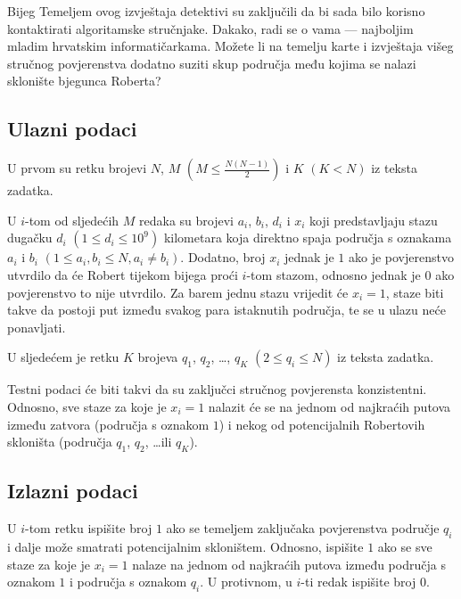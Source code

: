 \begin{statement}[
  problempoints=100,
  timelimit=1 sekunda,
  memorylimit=512 MiB,
]{Bijeg}
Temeljem ovog izvještaja detektivi su zaključili da bi sada bilo korisno
kontaktirati algoritamske stručnjake. Dakako, radi se o vama --- najboljim
mladim hrvatskim informatičarkama. Možete li na temelju karte i izvještaja višeg
stručnog povjerenstva dodatno suziti skup područja među kojima se nalazi
sklonište bjegunca Roberta?

\subsection*{Ulazni podaci}

U prvom su retku brojevi $N$, $M$ $(M \le \frac{N(N-1)}{2})$ i $K$ $(K < N)$
iz teksta zadatka.

U $i$-tom od sljedećih $M$ redaka su brojevi $a_i$, $b_i$, $d_i$ i $x_i$ koji
predstavljaju stazu dugačku $d_i$ $(1 \le d_i \le 10^9)$ kilometara koja
direktno spaja područja s oznakama $a_i$ i $b_i$ $(1 \le a_i, b_i \le N, a_i
\ne b_i)$. Dodatno, broj $x_i$ jednak je $1$ ako je povjerenstvo utvrdilo da će
Robert tijekom bijega proći $i$-tom stazom, odnosno jednak je $0$ ako
povjerenstvo to nije utvrdilo. Za barem jednu stazu vrijedit će $x_i = 1$,
staze biti takve da postoji put između svakog para istaknutih područja, te se u
ulazu neće ponavljati.

U sljedećem je retku $K$ brojeva $q_1$, $q_2$, \ldots, $q_K$ $(2 \le q_i \le N)$
iz teksta zadatka.

Testni podaci će biti takvi da su zaključci stručnog povjerensta konzistentni.
Odnosno, sve staze za koje je $x_i = 1$ nalazit će se na jednom od najkraćih
putova između zatvora (područja s oznakom $1$) i nekog od potencijalnih
Robertovih skloništa (područja $q_1$, $q_2$, \ldots ili $q_K$).

\clearpage

\subsection*{Izlazni podaci}

U $i$-tom retku ispišite broj $1$ ako se temeljem zaključaka povjerenstva područje
$q_i$ i dalje može smatrati potencijalnim skloništem. Odnosno, ispišite $1$ ako
se sve staze za koje je $x_i = 1$ nalaze na jednom od najkraćih putova između
područja s oznakom $1$ i područja s oznakom $q_i$. U protivnom, u $i$-ti redak
ispišite broj $0$.


\end{statement}
